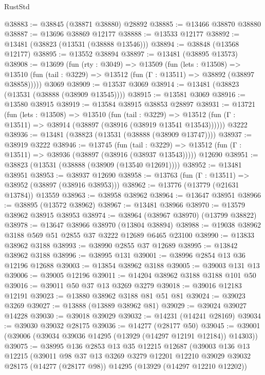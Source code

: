 \begin{lexlean}{RustStd}
\begin{coremodule}
@38883 := @38845 (@38871 @38880) @28892
@38885 := @13466 @38870 @38880
@38887 := @13696 @38869 @12177
@38888 := @13533 @12177
@38892 := @13481 (@38823 (@13531 (@38888 @13546)))
@38894 := @38848 (@13568 @12177)
@38895 := @13552 @38894
@38897 := @13481 (@38895 @13573)
@38908 := @13699
    (fun (rty : @3049) =>
    @13509
      (fun (lets : @13508) =>
      @13510 (fun (tail : @3229) => @13512 (fun (Γ : @13511) => @38892 (@38897 @38858)))))
    @3069
@38909 := @13537 @3069
@38914 := @13481 (@38823 (@13531 (@38888 (@38909 @13545))))
@38915 := @13581 @3069
@38916 := @13580 @38915
@38919 := @13584 @38915 @38853 @28897
@38931 := @13721
    (fun (lets : @13508) =>
    @13510
      (fun (tail : @3229) =>
      @13512 (fun (Γ : @13511) => @38914 (@38897 (@38916 (@38919 @13541 @13543))))))
    @3222
@38936 := @13481 (@38823 (@13531 (@38888 (@38909 @13747))))
@38937 := @38919 @3222
@38946 := @13745
    (fun (tail : @3229) => @13512 (fun (Γ : @13511) => @38936 (@38897 (@38916 (@38937 @13543)))))
    @12690
@38951 := @38823 (@13531 (@38888 (@38909 (@13540 @12691))))
@38952 := @13481 @38951
@38953 := @38937 @12690
@38958 := @13763 (fun (Γ : @13511) => @38952 (@38897 (@38916 @38953)))
@38962 := @13776 (@13779 (@21631 @13784)) @13559
@38963 := @38958 @38962
@38964 := @13647 @38951
@38966 := @38895 (@13572 @38962)
@38967 := @13481 @38966
@38970 := @13579 @38962 @38915 @38953
@38974 := @38964 (@38967 @38970) (@13799 @38822)
@38978 := @13647 @38966 @38970 (@13804 @38894)
@38988 := @19038 @38962 @3188 @569 @51 @2855 @37 @3222 @12689 @6465 @23100
@38990 := @13833 @38962 @3188
@38993 := @38990 @2855 @37 @12689
@38995 := @13842 @38962 @3188
@38996 := @38995 @131
@39001 := @38996 @2854 @13 @36 @12196 @12688
@39003 := @13854 @38962 @3188
@39005 := @39003 @131 @13
@39006 := @39005 @12196
@39011 := @14204 @38962 @3188 @3188 @101 @50
@39016 := @39011 @50 @37 @13 @3269 @3279
@39018 := @39016 @12183 @12191
@39023 := @13880 @38962 @3188 @81 @51 @81
@39024 := @39023 @3269
@39027 := @13888 (@13889 @38962 @81)
@39029 := @39024 @39027 @14228
@39030 := @39018 @39029
@39032 := @14231 (@14241 @28169)
@39034 := @39030 @39032 @28175
@39036 := @14277 (@28177 @50)
@39045 := @39001 (@39006 (@39034 @39036 @14295 (@13929 (@14297 @12191 @12184)) @14303))
@39075 := @38995
    @136
    @2853
    @13
    @35
    @12215
    @12687
    (@39003
      @136
      @13
      @12215
      (@39011
        @98
        @37
        @13
        @3269
        @3279
        @12201
        @12210
        @39029
        @39032
        @28175
        (@14277 (@28177 @98))
        @14295
        (@13929 (@14297 @12210 @12202))

\end{coremodule}
\end{lexlean}
